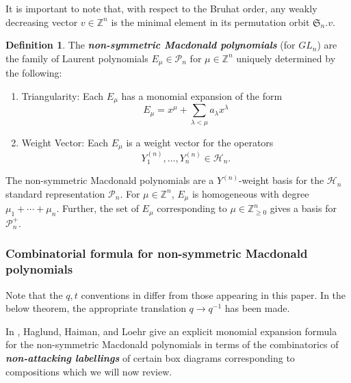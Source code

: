 \documentclass[11pt]{article}
\theoremstyle{definition}
\newtheorem{defi}[theo]{Definition}
\numberwithin{equation}{section}
\begin{document}
It is important to note that, with respect to the Bruhat order, any weakly decreasing vector $v \in \mathbb{Z}^n$ is the minimal element in its permutation orbit $\mathfrak{S}_n.v$.


\begin{defi} \label{defn3}
The \textbf{\textit{non-symmetric Macdonald polynomials}} (for $GL_n$) are the family of Laurent polynomials $E_{\mu} \in \mathscr{P}_n$ for $\mu \in \mathbb{Z}^n$ uniquely determined by the following:

\begin{enumerate}
    \item Triangularity: Each $E_{\mu}$ has a monomial expansion of the form $$E_{\mu} = x^{\mu} + \sum_{\lambda < \mu} a_{\lambda}x^{\lambda}$$
    
    
    \item Weight Vector: Each  $E_{\mu}$ is a weight vector for the operators $$Y_1^{(n)},\ldots,Y_n^{(n)} \in \mathscr{H}_n.$$
\end{enumerate}
\end{defi}

The non-symmetric Macdonald polynomials are a $Y^{(n)}$-weight basis for the $\mathscr{H}_n$ standard representation $\mathscr{P}_n$. For $\mu \in \mathbb{Z}^n$, $E_{\mu}$ is homogeneous with degree $\mu_1+\cdots +\mu_n$. Further, the set of $E_{\mu}$ corresponding to $\mu \in \mathbb{Z}_{\geq 0}^n$ gives a basis for $\mathscr{P}_n ^{+}$.

\subsubsection{Combinatorial formula for non-symmetric Macdonald polynomials}

Note that the $q,t$ conventions in \cite{haglund2007combinatorial} differ from those appearing in this paper. In the below theorem, the appropriate translation $q \rightarrow q^{-1}$ has been made.

In \cite{haglund2007combinatorial}, Haglund, Haiman, and Loehr give an explicit monomial expansion formula for the non-symmetric Macdonald polynomials in terms of the combinatorics of \textbf{\textit{non-attacking labellings}} of certain box diagrams corresponding to compositions which we will now review.
\end{document}
